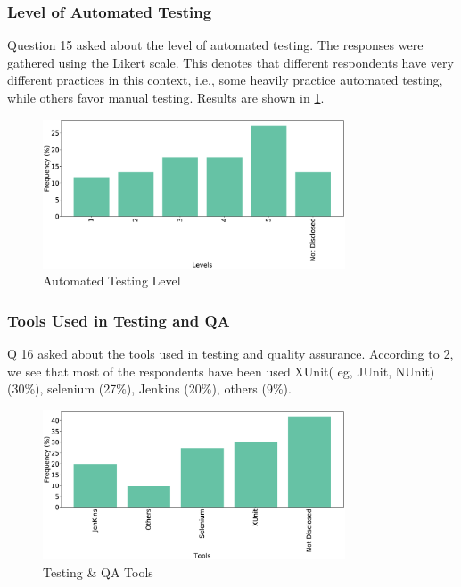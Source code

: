 \subsubsection{Level of Automated Testing}
Question 15 asked about the level of automated testing. The responses were gathered using the Likert scale. This denotes that different respondents have very different practices in this context, i.e., some heavily practice automated testing, while others favor manual testing. Results are shown in \cref{fig:autoTest}.
\begin{figure}[htbp]
\centering
  \includegraphics[width=0.8\textwidth]{Figures/Respondents_autotest_level}
  \caption{Automated Testing Level}
  \label{fig:autoTest}
\end{figure}

\subsubsection{Tools Used in Testing and QA}
Q 16 asked about the tools used in testing and quality assurance. According to \cref{fig:testingTools}, we see that most of the respondents have been used XUnit( eg, JUnit, NUnit) (30\%), selenium (27\%), Jenkins (20\%), others (9\%). 
\begin{figure}[htbp]
\centering
  \includegraphics[width=0.8\textwidth]{Figures/Respondents_testing_tools}
  \caption{Testing \& QA Tools}
  \label{fig:testingTools}
\end{figure}

